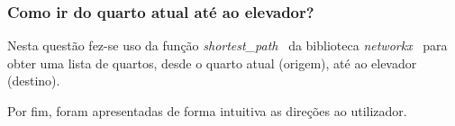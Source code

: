 \subsubsection{Como ir do quarto atual até ao elevador?}
\label{chap2:subsec:q6}

Nesta questão fez-se uso da função \textit{shortest\_path}~\cite{shortest_path} da biblioteca \textit{networkx}~\cite{networkx} para obter uma lista de quartos, desde o quarto atual (origem), até ao elevador (destino).

Por fim, foram apresentadas de forma intuitiva as direções ao utilizador.
